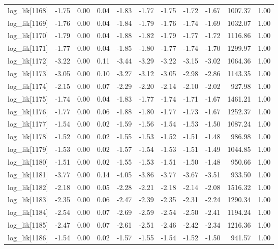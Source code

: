 \begin{table}[ht]
\begin{tabular}{rrrrrrrrrrr}
  log\_lik[1168] & -1.75 & 0.00 & 0.04 & -1.83 & -1.77 & -1.75 & -1.72 & -1.67 & 1007.37 & 1.00 \\ 
  log\_lik[1169] & -1.76 & 0.00 & 0.04 & -1.84 & -1.79 & -1.76 & -1.74 & -1.69 & 1032.07 & 1.00 \\ 
  log\_lik[1170] & -1.79 & 0.00 & 0.04 & -1.88 & -1.82 & -1.79 & -1.77 & -1.72 & 1116.86 & 1.00 \\ 
  log\_lik[1171] & -1.77 & 0.00 & 0.04 & -1.85 & -1.80 & -1.77 & -1.74 & -1.70 & 1299.97 & 1.00 \\ 
  log\_lik[1172] & -3.22 & 0.00 & 0.11 & -3.44 & -3.29 & -3.22 & -3.15 & -3.02 & 1064.36 & 1.00 \\ 
  log\_lik[1173] & -3.05 & 0.00 & 0.10 & -3.27 & -3.12 & -3.05 & -2.98 & -2.86 & 1143.35 & 1.00 \\ 
  log\_lik[1174] & -2.15 & 0.00 & 0.07 & -2.29 & -2.20 & -2.14 & -2.10 & -2.02 & 927.98 & 1.00 \\ 
  log\_lik[1175] & -1.74 & 0.00 & 0.04 & -1.83 & -1.77 & -1.74 & -1.71 & -1.67 & 1461.21 & 1.00 \\ 
  log\_lik[1176] & -1.77 & 0.00 & 0.06 & -1.88 & -1.80 & -1.77 & -1.73 & -1.67 & 1252.37 & 1.00 \\ 
  log\_lik[1177] & -1.54 & 0.00 & 0.02 & -1.59 & -1.56 & -1.54 & -1.53 & -1.50 & 1087.24 & 1.00 \\ 
  log\_lik[1178] & -1.52 & 0.00 & 0.02 & -1.55 & -1.53 & -1.52 & -1.51 & -1.48 & 986.98 & 1.00 \\ 
  log\_lik[1179] & -1.53 & 0.00 & 0.02 & -1.57 & -1.54 & -1.53 & -1.51 & -1.49 & 1044.85 & 1.00 \\ 
  log\_lik[1180] & -1.51 & 0.00 & 0.02 & -1.55 & -1.53 & -1.51 & -1.50 & -1.48 & 950.66 & 1.00 \\ 
  log\_lik[1181] & -3.77 & 0.00 & 0.14 & -4.05 & -3.86 & -3.77 & -3.67 & -3.51 & 933.50 & 1.00 \\ 
  log\_lik[1182] & -2.18 & 0.00 & 0.05 & -2.28 & -2.21 & -2.18 & -2.14 & -2.08 & 1516.32 & 1.00 \\ 
  log\_lik[1183] & -2.35 & 0.00 & 0.06 & -2.47 & -2.39 & -2.35 & -2.31 & -2.24 & 1290.34 & 1.00 \\ 
  log\_lik[1184] & -2.54 & 0.00 & 0.07 & -2.69 & -2.59 & -2.54 & -2.50 & -2.41 & 1194.24 & 1.00 \\ 
  log\_lik[1185] & -2.47 & 0.00 & 0.07 & -2.61 & -2.51 & -2.46 & -2.42 & -2.34 & 1216.36 & 1.00 \\ 
  log\_lik[1186] & -1.54 & 0.00 & 0.02 & -1.57 & -1.55 & -1.54 & -1.52 & -1.50 & 941.57 & 1.00 \\ 

\end{tabular}
\end{table}
